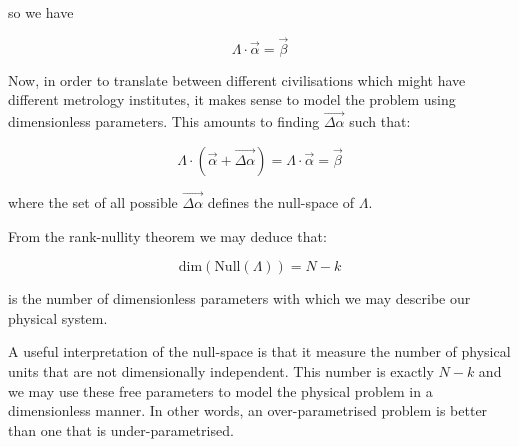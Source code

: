 \documentclass{article}
\begin{document}
so we have

\begin{equation}
\Lambda \cdot \vec{\alpha} = \vec{\beta} \tag{5}
\end{equation}

Now, in order to translate between different civilisations which might have different metrology institutes, it makes
sense to model the problem using dimensionless parameters. This amounts to finding $\vec{\Delta \alpha}$ such that:

\begin{equation}
\Lambda \cdot (\vec{\alpha} + \vec{\Delta \alpha}) = \Lambda \cdot \vec{\alpha} = \vec{\beta} \tag{6}
\end{equation}

where the set of all possible $\vec{\Delta \alpha}$ defines the null-space of $\Lambda$.

From the rank-nullity theorem we may deduce that:

\begin{equation}
\text{dim}(\text{Null}(\Lambda)) = N-k \tag{7}
\end{equation}

is the number of dimensionless parameters with which we may describe our physical system.

A useful interpretation of the null-space is that it measure the number of physical units that
are not dimensionally independent. This number is exactly $N-k$ and we may use these free
parameters to model the physical problem in a dimensionless manner. In other words, an over-parametrised problem is better than one that is under-parametrised.
\end{document}
